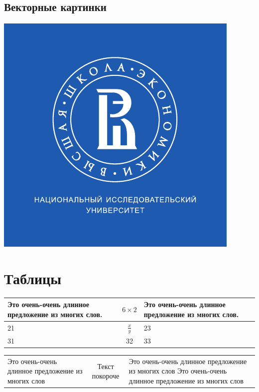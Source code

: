 \documentclass[a4paper,12pt]{article}
\begin{document}
\subsection{Векторные картинки}

\includegraphics[width=\textwidth]{logo}

\section{Таблицы}

\begin{tabular}{|p{4cm}cp{5cm}|}
	\hline
	Это очень-очень длинное предложение из многих слов. & $6\times 2$ &  Это очень-очень длинное предложение из многих слов. \\ 
	\hline
	21 & $\displaystyle \frac{x}{y}$ & 23  \\
	\hline
	31 & 32 & 33 \\ 
	\hline 
\end{tabular} 

\begin{tabularx}{\textwidth}{X|c|X}
	\hline
	Это очень-очень длинное предложение из многих слов & Текст покороче & Это очень-очень длинное предложение из многих слов Это очень-очень длинное предложение из многих слов
\end{tabularx}
\end{document}
